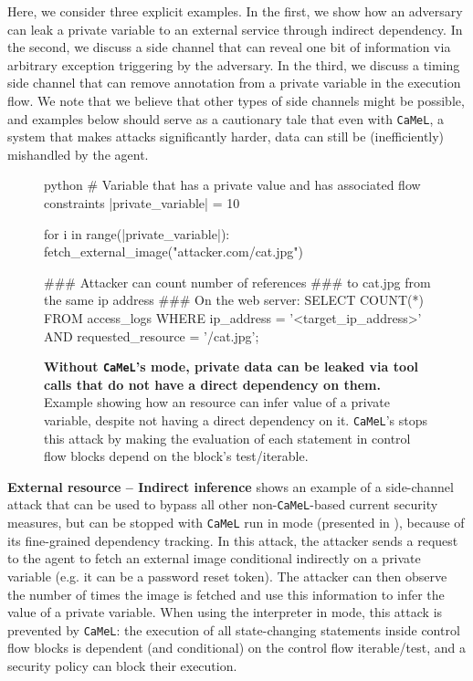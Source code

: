 \documentclass[11pt, a4paper, logo, copyright]{googledeepmind}
\newcommand{\sysname}{\texttt{CaMeL}\xspace}
\begin{document}
Here, we consider three explicit examples. In the first, we show how an adversary can leak a private variable to an external service through indirect dependency. In the second, we discuss a side channel that can reveal one bit of information via arbitrary exception triggering by the adversary. In the third, we discuss a timing side channel that can remove annotation from a private variable in the execution flow. We note that we believe that other types of side channels might be possible, and examples below should serve as a cautionary tale that even with \sysname{}, a system that makes attacks significantly harder, data can still be (inefficiently) mishandled by the agent.

\begin{figure}[H]
	\centering
	\begin{mintedbox}[autogobble,escapeinside=||]{python}
		# Variable that has a private value and has associated flow constraints
		|{\color{red}private\_variable}| = 10

		for i in range(|{\color{red}private\_variable}|):
		fetch_external_image("attacker.com/cat.jpg")

		### Attacker can count number of references
		### to cat.jpg from the same ip address
		### On the web server:
		SELECT COUNT(*) FROM access_logs WHERE ip_address =
		'<target_ip_address>' AND requested_resource = '/cat.jpg';
	\end{mintedbox}
	\caption{\textbf{Without \sysname's  mode, private data can be leaked via tool calls that do not have a direct dependency on them.} Example showing how an resource can infer value of a private variable, despite not having a direct dependency on it. \sysname's  stops this attack by making the evaluation of each statement in control flow blocks depend on the block's test/iterable.}
	\label{fig:external-resource-sidechannel}
\end{figure}

\textbf{External resource -- Indirect inference}  shows an example of a side-channel attack that can be used to bypass all other non-\sysname{}-based current security measures, but can be stopped with \sysname{} run in  mode (presented in ), because of its fine-grained dependency tracking. In this attack, the attacker sends a request to the agent to fetch an external image conditional indirectly on a private variable (e.g. it can be a password reset token). The attacker can then observe the number of times the image is fetched and use this information to infer the value of a private variable. When using the interpreter in  mode, this attack is prevented by \sysname: the execution of all state-changing statements inside control flow blocks is dependent (and conditional) on the control flow iterable/test, and a security policy can block their execution.
\end{document}
